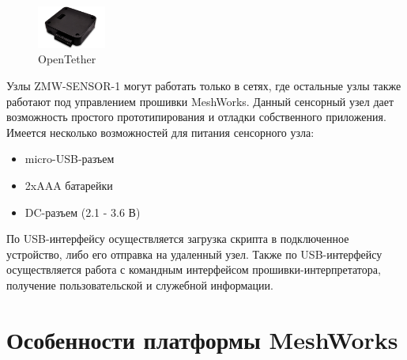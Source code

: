 \documentclass[12pt]{article}
\begin{document}
\begin{figure}
  \begin{center}
    \includegraphics[width=0.20\textwidth]{sensor_node.png}
  \end{center}
  \caption{OpenTether}
\end{figure}

Узлы ZMW-SENSOR-1 могут работать только в сетях, где остальные узлы также работают 
под управлением прошивки MeshWorks. Данный сенсорный узел дает возможность 
простого прототипирования и отладки собственного приложения.
Имеется несколько возможностей для питания сенсорного узла:
\begin{itemize}
 \item micro-USB-разъем
 \item 2xAAA батарейки
 \item DC-разъем (2.1 - 3.6 В)
\end{itemize}

По USB-интерфейсу осуществляется загрузка скрипта в подключенное устройство, либо 
его отправка на удаленный узел. Также по USB-интерфейсу осуществляется работа с
командным интерфейсом прошивки-интерпретатора, получение пользовательской и служебной
информации.

\section{Особенности платформы MeshWorks}
\end{document}
